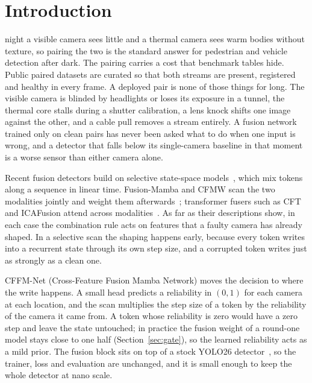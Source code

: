 \section{Introduction}
\label{sec:intro}
 night a visible camera sees little and a thermal camera sees warm bodies without texture, so pairing the two is the standard answer for pedestrian and vehicle detection after dark. The pairing carries a cost that benchmark tables hide. Public paired datasets are curated so that both streams are present, registered and healthy in every frame. A deployed pair is none of those things for long. The visible camera is blinded by headlights or loses its exposure in a tunnel, the thermal core stalls during a shutter calibration, a lens knock shifts one image against the other, and a cable pull removes a stream entirely. A fusion network trained only on clean pairs has never been asked what to do when one input is wrong, and a detector that falls below its single-camera baseline in that moment is a worse sensor than either camera alone.

Recent fusion detectors build on selective state-space models~\cite{gu2023mamba}, which mix tokens along a sequence in linear time. Fusion-Mamba and CFMW scan the two modalities jointly and weight them afterwards~\cite{dong2025fusionmamba,li2025cfmw}; transformer fusers such as CFT and ICAFusion attend across modalities~\cite{fang2021cft,shen2024icafusion}. As far as their descriptions show, in each case the combination rule acts on features that a faulty camera has already shaped. In a selective scan the shaping happens early, because every token writes into a recurrent state through its own step size, and a corrupted token writes just as strongly as a clean one.

CFFM-Net (Cross-Feature Fusion Mamba Network) moves the decision to where the write happens. A small head predicts a reliability in $(0,1)$ for each camera at each location, and the scan multiplies the step size of a token by the reliability of the camera it came from. A token whose reliability is zero would have a zero step and leave the state untouched; in practice the fusion weight of a round-one model stays close to one half (Section~\ref{sec:gate}), so the learned reliability acts as a mild prior. The fusion block sits on top of a stock YOLO26 detector~\cite{yolo26_2026}, so the trainer, loss and evaluation are unchanged, and it is small enough to keep the whole detector at nano scale.

